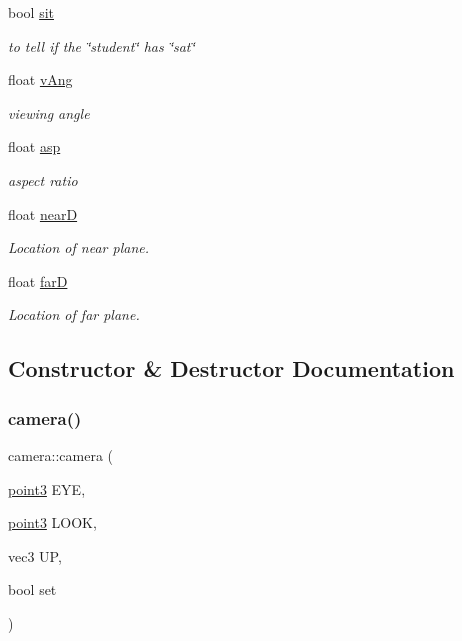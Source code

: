 \begin{DoxyCompactItemize}
bool \hyperlink{classcamera_a7df2e3c3ed6046af3eb905462866b118}{sit}
\begin{DoxyCompactList}\small\item\em to tell if the \char`\"{}student\char`\"{} has \char`\"{}sat\char`\"{} \end{DoxyCompactList}\item 
float \hyperlink{classcamera_ae8f2970ceb202edb61903e139271913d}{v\+Ang}
\begin{DoxyCompactList}\small\item\em viewing angle \end{DoxyCompactList}\item 
float \hyperlink{classcamera_aa7ca5df7a2626926b97db7d20f57de24}{asp}
\begin{DoxyCompactList}\small\item\em aspect ratio \end{DoxyCompactList}\item 
float \hyperlink{classcamera_acc408f55afe5a320132da72d46498d7d}{nearD}
\begin{DoxyCompactList}\small\item\em Location of near plane. \end{DoxyCompactList}\item 
float \hyperlink{classcamera_a970214e0ae175df8fb37d25a8081cea3}{farD}
\begin{DoxyCompactList}\small\item\em Location of far plane. \end{DoxyCompactList}\end{DoxyCompactItemize}


\subsection{Constructor \& Destructor Documentation}
\hypertarget{classcamera_a44a13e132dac8dde93536347ac2d18a6}{}\label{classcamera_a44a13e132dac8dde93536347ac2d18a6} 
\subsubsection{\texorpdfstring{camera()}{camera()}}
{\footnotesize\ttfamily camera\+::camera (\begin{DoxyParamCaption}\item[{\hyperlink{classpoint3}{point3}}]{E\+YE,  }\item[{\hyperlink{classpoint3}{point3}}]{L\+O\+OK,  }\item[{vec3}]{UP,  }\item[{bool}]{set }\end{DoxyParamCaption})}

